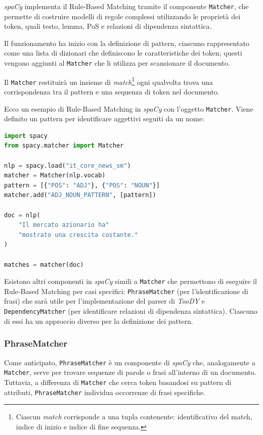 \documentclass[12pt]{report}
\newcommand{\toody}{\textsl{TooDY}\xspace}
\newcommand{\spacy}{\textsl{spaCy}\xspace}
\begin{document}
\spacy implementa il Rule-Based Matching tramite il componente \texttt{Matcher}, che permette di costruire modelli di regole complessi utilizzando le proprietà dei token, quali testo, lemma, PoS e relazioni di dipendenza sintattica.

Il funzionamento ha inizio con la definizione di pattern, ciascuno rappresentato come una lista di dizionari che definiscono le caratteristiche dei token; questi vengono aggiunti al \texttt{Matcher} che li utilizza per scansionare il documento.

Il \texttt{Matcher} restituirà un insieme di \textit{match}\footnote{Ciascun \textit{match} corrisponde a una tupla contenente: identificativo del match, indice di inizio e indice di fine sequenza.} ogni qualvolta trova una corrispondenza tra il pattern e una sequenza di token nel documento.

\begin{mdframed}
\small
Ecco un esempio di Rule-Based Matching in \spacy con l'oggetto \texttt{Matcher}. Viene definito un pattern per identificare aggettivi seguiti da un nome:

\begin{lstlisting}[language=Python]
import spacy
from spacy.matcher import Matcher

nlp = spacy.load("it_core_news_sm")
matcher = Matcher(nlp.vocab)
pattern = [{"POS": "ADJ"}, {"POS": "NOUN"}]
matcher.add("ADJ_NOUN_PATTERN", [pattern])

doc = nlp(
    "Il mercato azionario ha"
    "mostrato una crescita costante."
)

matches = matcher(doc)
\end{lstlisting}
\end{mdframed}

Esistono altri componenti in \spacy simili a \texttt{Matcher} che permettono di eseguire il Rule-Based Matching per casi specifici: \texttt{PhraseMatcher} (per l'identificazione di frasi) che sarà utile per l'implementazione del parser di \toody e \texttt{DependencyMatcher} (per identificare relazioni di dipendenza sintattica). Ciascuno di essi ha un approccio diverso per la definizione dei pattern.



\subsubsection{PhraseMatcher}
Come anticipato, \texttt{PhraseMatcher} è un componente di \spacy che, analogamente a \texttt{Matcher}, serve per trovare sequenze di parole o frasi all'interno di un documento. Tuttavia, a differenza di \texttt{Matcher} che cerca token basandosi su pattern di attributi, \texttt{PhraseMatcher} individua occorrenze di frasi specifiche.
\end{document}
